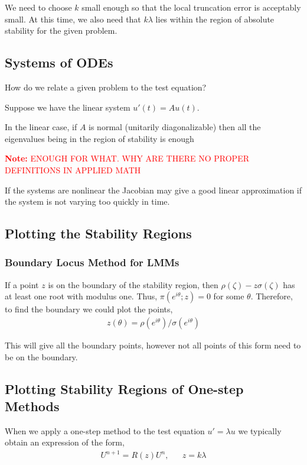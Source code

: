 \documentclass[12pt]{article}
\newcommand{\note}[1]{\textcolor{red}{\textbf{Note:} #1}}
\begin{document}
We need to choose \( k \) small enough so that the local truncation error is acceptably small. At this time, we also need that \( k\lambda \) lies within the region of absolute stability for the given problem.

\subsection{Systems of ODEs}
How do we relate a given problem to the test equation?

Suppose we have the linear system \( u'(t) = Au(t) \).

In the linear case, if \( A \) is normal (unitarily diagonalizable) then all the eigenvalues being in the region of stability is enough 

\note{ENOUGH FOR WHAT. WHY ARE THERE NO PROPER DEFINITIONS IN APPLIED MATH}

If the systems are nonlinear the Jacobian may give a good linear approximation if the system is not varying too quickly in time.

\subsection{Plotting the Stability Regions}

\subsubsection{Boundary Locus Method for LMMs}
If a point \( z \) is on the boundary of the stability region, then \( \rho(\zeta) - z\sigma(\zeta) \) has at least one root with modulus one. Thus, \( \pi(e^{i\theta};z) = 0 \) for some \( \theta \). Therefore, to find the boundary we could plot the points,
\begin{align*}
    z(\theta) = \rho(e^{i\theta})/\sigma(e^{i\theta})
\end{align*}

This will give all the boundary points, however not all points of this form need to be on the boundary.

\subsection{Plotting Stability Regions of One-step Methods}
When we apply a one-step method to the test equation \( u' = \lambda u \) we typically obtain an expression of the form,
\begin{align*}
    U^{n+1} = R(z) U^{n}, && z = k\lambda
\end{align*}
\end{document}
